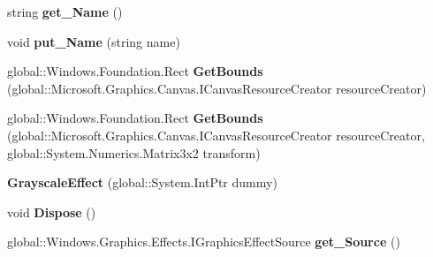 \begin{DoxyCompactItemize}
string {\bfseries get\+\_\+\+Name} ()
\item 
\mbox{\label{class_microsoft_1_1_graphics_1_1_canvas_1_1_effects_1_1_grayscale_effect_a6f0da33fc5a20068a080efaf0d6a77a0}} 
void {\bfseries put\+\_\+\+Name} (string name)
\item 
\mbox{\label{class_microsoft_1_1_graphics_1_1_canvas_1_1_effects_1_1_grayscale_effect_ac52042872c6556a310cff19bb7c4040f}} 
global\+::\+Windows.\+Foundation.\+Rect {\bfseries Get\+Bounds} (global\+::\+Microsoft.\+Graphics.\+Canvas.\+I\+Canvas\+Resource\+Creator resource\+Creator)
\item 
\mbox{\label{class_microsoft_1_1_graphics_1_1_canvas_1_1_effects_1_1_grayscale_effect_a1d303822b3c4206b73165e84e42e55cd}} 
global\+::\+Windows.\+Foundation.\+Rect {\bfseries Get\+Bounds} (global\+::\+Microsoft.\+Graphics.\+Canvas.\+I\+Canvas\+Resource\+Creator resource\+Creator, global\+::\+System.\+Numerics.\+Matrix3x2 transform)
\item 
\mbox{\label{class_microsoft_1_1_graphics_1_1_canvas_1_1_effects_1_1_grayscale_effect_a015472d5b20c0e171a411c27f64edc01}} 
{\bfseries Grayscale\+Effect} (global\+::\+System.\+Int\+Ptr dummy)
\item 
\mbox{\label{class_microsoft_1_1_graphics_1_1_canvas_1_1_effects_1_1_grayscale_effect_a7372dc109bbbb885617e2d79209b7c87}} 
void {\bfseries Dispose} ()
\item 
\mbox{\label{class_microsoft_1_1_graphics_1_1_canvas_1_1_effects_1_1_grayscale_effect_a2e2ee157a9b4c692f2f71f46fd3aa570}} 
global\+::\+Windows.\+Graphics.\+Effects.\+I\+Graphics\+Effect\+Source {\bfseries get\+\_\+\+Source} ()
\item 
\mbox{\label{class_microsoft_1_1_graphics_1_1_canvas_1_1_effects_1_1_grayscale_effect_aacc2139785cbbe136738db75ab05743c}} 

\end{DoxyCompactItemize}
